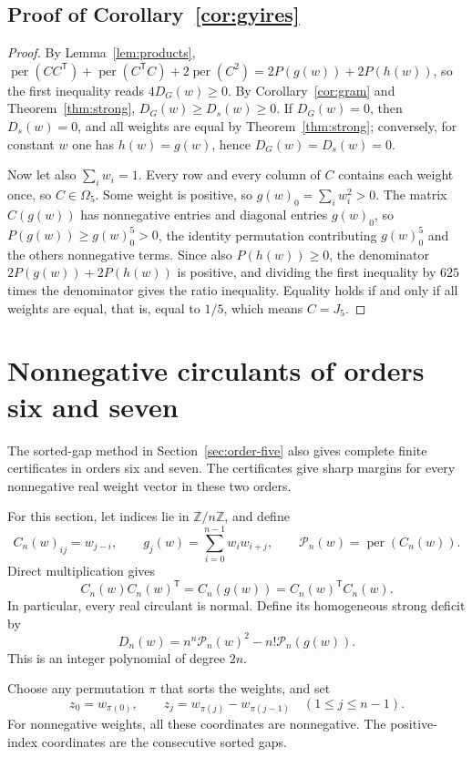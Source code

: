\documentclass[11pt,a4paper]{article}
\theoremstyle{definition}
\theoremstyle{remark}
\newcommand{\Z}{\mathbb{Z}}
\newcommand{\per}{\operatorname{per}}
\newcommand{\T}{\mathsf{T}}
\begin{document}
\subsection{Proof of Corollary~\ref{cor:gyires}}

\begin{proof}
By Lemma~\ref{lem:products},
$\per(CC^\T)+\per(C^\T C)+2\per(C^2)=2P(g(w))+2P(h(w))$, so the first inequality reads $4D_G(w)\ge0$. By
Corollary~\ref{cor:gram} and Theorem~\ref{thm:strong}, $D_G(w)\ge D_s(w)\ge0$. If $D_G(w)=0$, then $D_s(w)=0$, and
all weights are equal by Theorem~\ref{thm:strong}; conversely, for constant $w$ one has $h(w)=g(w)$, hence
$D_G(w)=D_s(w)=0$.

Now let also $\sum_iw_i=1$. Every row and every column of $C$ contains each weight once, so $C\in\Omega_5$. Some weight
is positive, so $g(w)_0=\sum_iw_i^2>0$. The matrix $C(g(w))$ has nonnegative entries and diagonal entries $g(w)_0$, so
$P(g(w))\ge g(w)_0^5>0$, the identity permutation contributing $g(w)_0^5$ and the others nonnegative terms. Since also
$P(h(w))\ge0$, the denominator $2P(g(w))+2P(h(w))$ is positive, and dividing the first inequality by $625$ times the denominator gives
the ratio inequality. Equality holds if and only if all weights are equal, that is, equal to $1/5$, which means
$C=J_5$.
\end{proof}


\section{Nonnegative circulants of orders six and seven}\label{sec:circulant-six-seven}

The sorted-gap method in Section~\ref{sec:order-five} also gives complete
finite certificates in orders six and seven. The certificates give sharp margins
for every nonnegative real weight vector in these two orders.

For this section, let indices lie in $\Z/n\Z$, and define
\[
 C_n(w)_{ij}=w_{j-i},\qquad
 g_j(w)=\sum_{i=0}^{n-1}w_iw_{i+j},\qquad
 \mathcal P_n(w)=\per(C_n(w)).
\]
Direct multiplication gives
\[
 C_n(w)C_n(w)^\T=C_n(g(w))=C_n(w)^{\T}C_n(w).
\]
In particular, every real circulant is normal. Define its homogeneous
strong deficit by
\begin{equation}\label{eq:c67-deficit}
 D_n(w)=n^n\mathcal P_n(w)^2-n!\mathcal P_n(g(w)).
\end{equation}
This is an integer polynomial of degree $2n$.

Choose any permutation $\pi$ that sorts the weights, and set
\[
 z_0=w_{\pi(0)},\qquad
 z_j=w_{\pi(j)}-w_{\pi(j-1)}\quad(1\le j\le n-1).
\]
For nonnegative weights, all these coordinates are nonnegative.
The positive-index coordinates are the consecutive sorted gaps.
\end{document}
